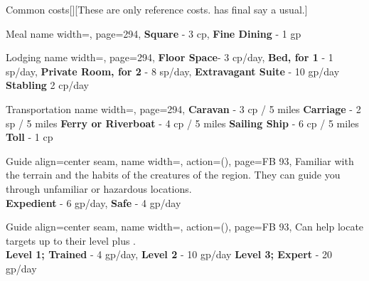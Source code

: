 \begin{PageBackLandscape}
\begin{TablesHalf}{\backTableHeight}
\begin{Table}{Common costs}[][These are only reference costs. \GM has final say a usual.]
\begin{entry}{Meal}{%
                name width=\turnLength,%
                page=294,
            }
                \textbf{Square} - 3 cp, \quad
                \textbf{Fine Dining} - 1 gp \quad
            \end{entry}
            \begin{entry}{Lodging}{%
                name width=\turnLength,%
                page=294,
            }
                \textbf{Floor Space}- 3 cp/day, \hfill
                \textbf{Bed, for 1} - 1 sp/day, \hfill
                \textbf{Private Room, for 2} - 8 sp/day, \hfill
                \textbf{Extravagant Suite} - 10 gp/day \hfill\vline\hfill \textbf{Stabling} 2 cp/day
            \end{entry}
            \begin{entry}{Transportation}{%
                name width=\turnLength,%
                page=294,
            }%
                \textbf{Caravan} - 3 cp / 5 miles\hfill
                \textbf{Carriage} - 2 sp / 5 miles\hfill
                \textbf{Ferry or Riverboat} - 4 cp / 5 miles\hfill
                \textbf{Sailing Ship} - 6 cp / 5 miles \hfill\vline\hfill
                \textbf{Toll} - 1 cp
            \end{entry}
            \breakLine[Help]
            \begin{entry}{Guide }{%
                align=center seam,
                name width=\turnLength,%
                action={\BodyFont ()},
                page=FB 93,
            }%
                Familiar with the terrain and the habits of the creatures of the region.
                They can guide you through unfamiliar or hazardous locations.\\
                \textbf{Expedient} - 6 gp/day,\quad
                \textbf{Safe} - 4 gp/day 
            \end{entry}
            \begin{entry}{Guide }{%
                align=center seam,
                name width=\turnLength,%
                action={\BodyFont ()},
                page=FB 93,
            }
                Can help locate targets up to their level plus . \hfill
                \\
                \textbf{Level 1; Trained} - 4 gp/day, \hfill
                \textbf{Level 2} - 10 gp/day\hfill
                \textbf{Level 3; Expert} - 20 gp/day\hfill

\end{entry}
\end{Table}
\end{TablesHalf}
\end{PageBackLandscape}

